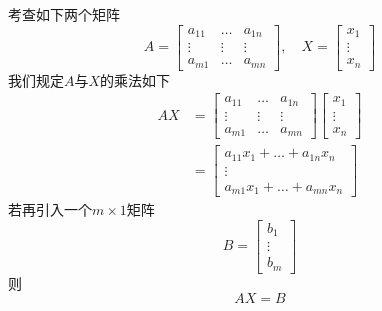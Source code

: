 \documentclass[11pt]{article}
\begin{document}
考查如下两个矩阵
\begin{equation*}
A=
\begin{bmatrix}
a_{11}&\dots&a_{1n}\\
\vdots&\vdots&\vdots\\
a_{m1}&\dots&a_{mn}
\end{bmatrix},\quad X=
\begin{bmatrix}
x_1\\
\vdots\\
x_n
\end{bmatrix}
\end{equation*}
我们规定\(A\)与\(X\)的乘法如下
\begin{align*}
AX&=
\begin{bmatrix}
a_{11}&\dots&a_{1n}\\
\vdots&\vdots&\vdots\\
a_{m1}&\dots&a_{mn}
\end{bmatrix}
\begin{bmatrix}
x_1\\\vdots\\x_n
\end{bmatrix}\\
&=
\begin{bmatrix}
a_{11}x_1+\dots+a_{1n}x_n\\
\vdots\\
a_{m1}x_1+\dots+a_{mn}x_n
\end{bmatrix}
\end{align*}
若再引入一个\(m\times1\)矩阵
\begin{equation*}
B=
\begin{bmatrix}
b_1\\\vdots\\b_m
\end{bmatrix}
\end{equation*}
则
\begin{equation*}
AX=B
\end{equation*}
\end{document}
